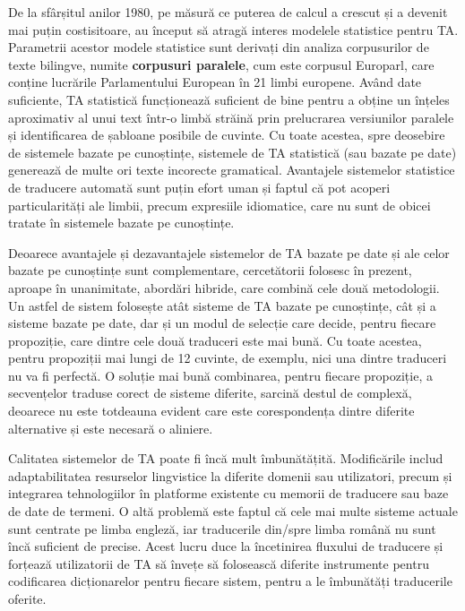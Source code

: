 \begin{multicols}{2}
De la sfârșitul anilor 1980, pe măsură ce puterea de calcul a crescut și a devenit mai puțin costisitoare, au început să atragă interes modelele statistice pentru TA. Parametrii acestor modele statistice sunt derivați din analiza corpusurilor de texte bilingve, numite \textbf{corpusuri paralele}, cum este corpusul Europarl, care conține lucrările Parlamentului European în 21 limbi europene. Având date suficiente, TA statistică funcționează suficient de bine pentru a obține un înțeles aproximativ al unui text \mbox{într-o} limbă străină prin prelucrarea versiunilor paralele și identificarea de șabloane posibile de cuvinte. Cu toate acestea, spre deosebire de sistemele bazate pe cunoștințe, sistemele de TA statistică (sau bazate pe date) generează de multe ori texte incorecte gramatical. Avantajele sistemelor statistice de traducere automată sunt puțin efort uman și faptul că pot acoperi particularități ale limbii, precum expresiile idiomatice, care nu sunt de obicei tratate în sistemele bazate pe cunoștințe.

Deoarece avantajele și dezavantajele sistemelor de TA bazate pe date și ale celor bazate pe cunoștințe sunt complementare, cercetătorii folosesc în prezent, aproape în unanimitate, abordări hibride, care combină cele două metodologii. Un astfel de sistem folosește atât sisteme de TA bazate pe cunoștințe, cât și a sisteme bazate pe date, dar și un modul de selecție care decide, pentru fiecare propoziție, care dintre cele două traduceri este mai bună. Cu toate acestea, pentru propoziții mai lungi de 12 cuvinte, de exemplu, nici una dintre traduceri nu va fi perfectă. O soluție mai bună combinarea, pentru fiecare propoziție, a secvențelor traduse corect de sisteme diferite, sarcină destul de complexă, deoarece nu este totdeauna evident care este corespondența dintre diferite alternative și este necesară o aliniere. 

Calitatea sistemelor de TA poate fi încă mult îmbunătățită. Modificările includ adaptabilitatea resurselor lingvistice la diferite domenii sau utilizatori, precum și integrarea tehnologiilor în platforme existente cu memorii de traducere sau baze de date de termeni. O altă problemă este faptul că cele mai multe sisteme actuale sunt centrate pe limba engleză, iar traducerile din/spre limba română nu sunt încă suficient de precise. Acest lucru duce la încetinirea fluxului de traducere și forțează utilizatorii de TA să învețe să folosească diferite instrumente pentru codificarea dicționarelor pentru fiecare sistem, pentru a le îmbunătăți traducerile oferite.


\end{multicols}
